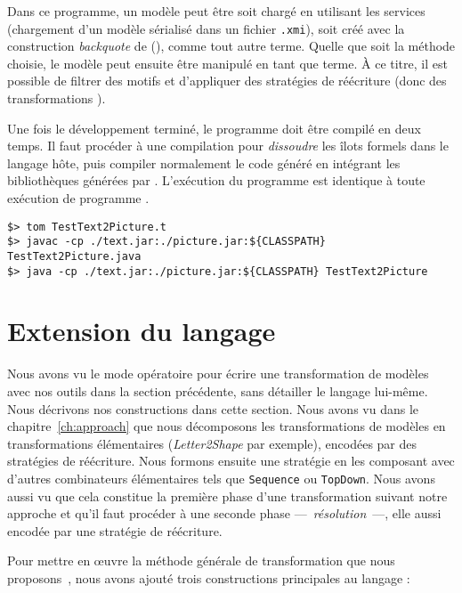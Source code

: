 \begin{figure}[H]
  \centering
  
\end{figure}

Dans ce programme, un modèle peut être soit chargé en utilisant les services
{\emf} (chargement d'un modèle sérialisé dans un fichier \texttt{.xmi}), soit
créé avec la construction \emph{backquote} de {\tom} (), comme tout
autre terme. Quelle que soit la méthode choisie, le modèle peut ensuite être
manipulé en tant que terme. À ce titre, il est possible de filtrer des motifs
et d'appliquer des stratégies de réécriture (donc des transformations {\tom}).

Une fois le développement terminé, le programme doit être compilé en deux
temps. Il faut procéder à une compilation {\tom} pour \emph{dissoudre} les
îlots formels {\tom} dans le langage hôte, puis compiler normalement le code
{\java} généré en intégrant les bibliothèques générées par {\emf}. L'exécution
du programme est identique à toute exécution de programme {\java}.

\begin{verbatim}
$> tom TestText2Picture.t
$> javac -cp ./text.jar:./picture.jar:${CLASSPATH} TestText2Picture.java
$> java -cp ./text.jar:./picture.jar:${CLASSPATH} TestText2Picture
\end{verbatim}



\section{Extension du langage}

Nous avons vu le mode opératoire pour écrire une transformation de modèles avec
nos outils dans la section précédente, sans détailler le langage lui-même. Nous
décrivons nos constructions dans cette section. Nous avons vu dans le
chapitre~\ref{ch:approach} que nous décomposons les transformations de modèles
en transformations élémentaires (\emph{Letter2Shape} par exemple), encodées par
des stratégies de réécriture.  Nous formons ensuite une stratégie en les
composant avec d'autres combinateurs élémentaires tels que \texttt{Sequence} ou
\texttt{TopDown}. Nous avons aussi vu que cela constitue la première phase
d'une transformation suivant notre approche et qu'il faut procéder à une
seconde phase ---~\emph{résolution}~---, elle aussi encodée par une stratégie
de réécriture.

Pour mettre en œuvre la méthode générale de transformation que nous
proposons~\cite{Bach2012}, nous avons ajouté trois constructions principales au
langage {\tom} :

